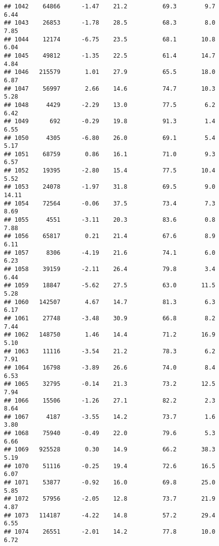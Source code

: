 \documentclass[
]{article}
\begin{document}
\begin{verbatim}
## 1042    64866      -1.47    21.2          69.3        9.7              6.44
## 1043    26853      -1.78    28.5          68.3        8.0              7.85
## 1044    12174      -6.75    23.5          68.1       10.8              6.04
## 1045    49812      -1.35    22.5          61.4       14.7              4.84
## 1046   215579       1.01    27.9          65.5       18.0              6.87
## 1047    56997       2.66    14.6          74.7       10.3              5.28
## 1048     4429      -2.29    13.0          77.5        6.2              6.42
## 1049      692      -0.29    19.8          91.3        1.4              6.55
## 1050     4305      -6.80    26.0          69.1        5.4              5.17
## 1051    68759       0.86    16.1          71.0        9.3              6.57
## 1052    19395      -2.80    15.4          77.5       10.4              5.52
## 1053    24078      -1.97    31.8          69.5        9.0             14.11
## 1054    72564      -0.06    37.5          73.4        7.3              8.69
## 1055     4551      -3.11    20.3          83.6        0.8              7.88
## 1056    65817       0.21    21.4          67.6        8.9              6.11
## 1057     8306      -4.19    21.6          74.1        6.0              6.23
## 1058    39159      -2.11    26.4          79.8        3.4              6.44
## 1059    18847      -5.62    27.5          63.0       11.5              5.28
## 1060   142507       4.67    14.7          81.3        6.3              6.17
## 1061    27748      -3.48    30.9          66.8        8.2              7.44
## 1062   148750       1.46    14.4          71.2       16.9              5.10
## 1063    11116      -3.54    21.2          78.3        6.2              7.91
## 1064    16798      -3.89    26.6          74.0        8.4              6.53
## 1065    32795      -0.14    21.3          73.2       12.5              7.94
## 1066    15506      -1.26    27.1          82.2        2.3              8.64
## 1067     4187      -3.55    14.2          73.7        1.6              3.80
## 1068    75940      -0.49    22.0          79.6        5.3              6.66
## 1069   925528       0.30    14.9          66.2       38.3              5.19
## 1070    51116      -0.25    19.4          72.6       16.5              6.07
## 1071    53877      -0.92    16.0          69.8       25.0              5.85
## 1072    57956      -2.05    12.8          73.7       21.9              4.87
## 1073   114187      -4.22    14.8          57.2       29.4              6.55
## 1074    26551      -2.01    14.2          77.8       10.0              6.72

\end{verbatim}
\end{document}
